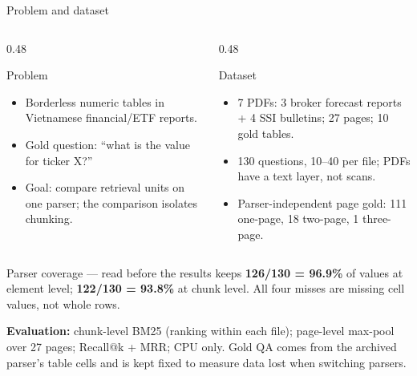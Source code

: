 \documentclass[aspectratio=169,11pt]{beamer}
\newcommand{\code}[1]{\texttt{\detokenize{#1}}}
\begin{document}
\begin{frame}{Problem and dataset}
  \begin{columns}[T]
    \begin{column}{0.48\textwidth}
      \begin{block}{Problem}
        \begin{itemize}\footnotesize
          \item Borderless numeric tables in Vietnamese financial/ETF reports.
          \item Gold question: ``what is the value for ticker X?''
          \item Goal: compare retrieval units on one parser; the comparison
            isolates chunking.
        \end{itemize}
      \end{block}
    \end{column}
    \begin{column}{0.48\textwidth}
      \begin{block}{Dataset}
        \begin{itemize}\footnotesize
          \item 7 PDFs: 3 broker forecast reports + 4 SSI bulletins;
            27 pages; 10 gold tables.
          \item 130 questions, 10--40 per file; PDFs have a text layer,
            not scans.
          \item Parser-independent page gold: 111 one-page, 18 two-page,
            1 three-page.
        \end{itemize}
      \end{block}
    \end{column}
  \end{columns}

  \begin{alertblock}{Parser coverage --- read before the results}
    \footnotesize
    \code{unstructured} keeps \textbf{126/130 = 96.9\%} of values at element
    level; \textbf{122/130 = 93.8\%} at chunk level.
    All four misses are missing cell values, not whole rows.
  \end{alertblock}

  {\scriptsize
  \textbf{Evaluation:} chunk-level BM25 (ranking within each file); page-level
  max-pool over 27 pages; Recall@k + MRR; CPU only. Gold QA comes from the
  archived parser's table cells and is kept fixed to measure data lost when
  switching parsers.}
\end{frame}
\end{document}
